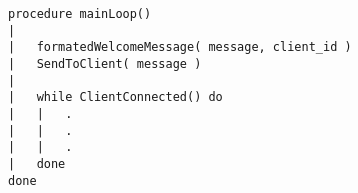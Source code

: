 \begin{lstlisting}
procedure mainLoop()
|
|	formatedWelcomeMessage( message, client_id )
|	SendToClient( message )
|	
|	while ClientConnected() do
|	|	.
|	|	.
|	|	.
|	done
done
\end{lstlisting}